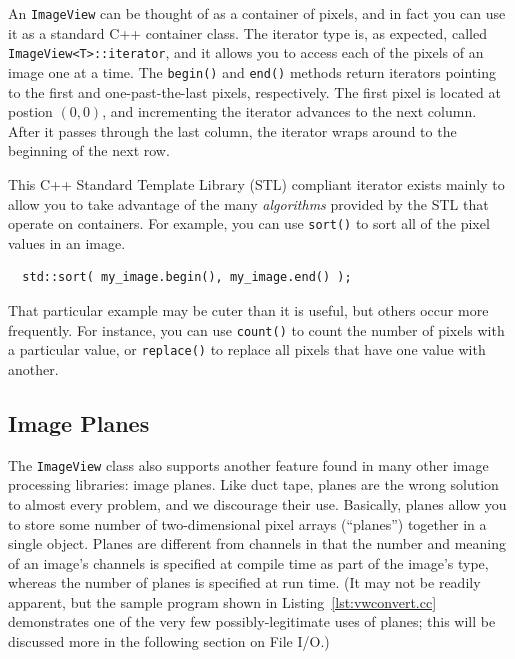 An \verb#ImageView# can be thought of as a container of pixels, and in
fact you can use it as a standard C++ container class.  The iterator
type is, as expected, called \verb#ImageView<T>::iterator#, and it
allows you to access each of the pixels of an image one at a time.
The \verb#begin()# and \verb#end()# methods return iterators pointing
to the first and one-past-the-last pixels, respectively.  The first
pixel is located at postion $(0,0)$, and incrementing the iterator
advances to the next column.  After it passes through the last column,
the iterator wraps around to the beginning of the next row.

This C++ Standard Template Library (STL) compliant iterator exists
mainly to allow you to take advantage of the many {\it algorithms}
provided by the STL that operate on containers.  For example, you can
use \verb#sort()# to sort all of the pixel values in an image.
\begin{verbatim}
  std::sort( my_image.begin(), my_image.end() );
\end{verbatim}
That particular example may be cuter than it is useful, but others
occur more frequently.  For instance, you can use \verb#count()# to
count the number of pixels with a particular value, or
\verb#replace()# to replace all pixels that have one value with
another.

\subsection{Image Planes}

The \verb#ImageView# class also supports another feature found in many
other image processing libraries: image planes.  Like duct tape,
planes are the wrong solution to almost every problem, and we
discourage their use.  Basically, planes allow you to store some
number of two-dimensional pixel arrays (``planes'') together in a
single object.  Planes are different from channels in that the number
and meaning of an image's channels is specified at compile time as
part of the image's type, whereas the number of planes is specified at
run time.  (It may not be readily apparent, but the sample program
shown in Listing~\ref{lst:vwconvert.cc} demonstrates one of the very
few possibly-legitimate uses of planes; this will be discussed more in
the following section on File I/O.)

